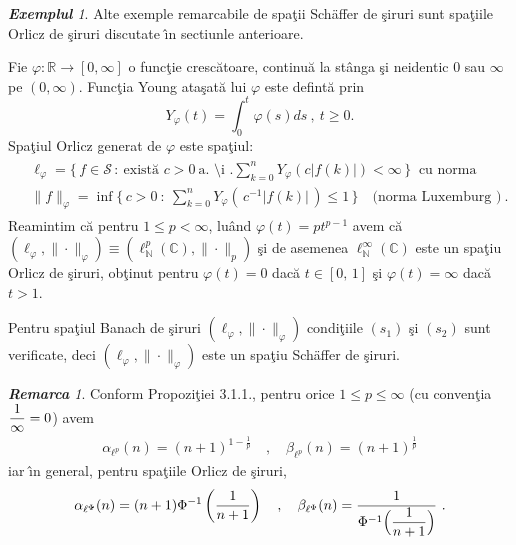 \documentclass[ a4paper, 12pt]{report}
\newcommand{\C}{\mathbb{C}}
\newcommand{\R}{\mathbb{R}}
\newcommand{\N}{\mathbb{N}}
\theoremstyle{definition}
\theoremstyle{remark}
\newtheorem{remarc}{\bf Remarca}[section]
\newtheorem{exemple}{\bf Exemplul}[section]
\numberwithin{equation}{section}
\begin{document}
\begin{exemple}
Alte exemple remarcabile de spa\c tii Sch\"{a}ffer de \c siruri sunt spa\c tiile Orlicz de \c siruri discutate \^\i n sectiunle anterioare.

Fie $\varphi:\R\to[0,\infty]$  o func\c tie cresc\u atoare, continu\u a la st\^ anga \c si neidentic $0$ sau $\infty$ pe $(0,\infty)$. Func\c tia Young ata\c sat\u a lui $\varphi$ este defint\u a prin
$$Y_\varphi(t)=\int_{0}^t\varphi(s)ds\ ,\ t\geq0.$$ Spa\c tiul Orlicz generat de $\varphi$ este spa\c tiul:
\begin{gather*}
\begin{split}
& \ell_{\varphi}=\{\,f\in\mathcal{S}\,:\ \text{exist\u a  }c>0\ \text{a. \^\i .} \sum_{k=0}^nY_\varphi(c|f(k)|)<\infty\,\}\ \text{ cu norma }\\
& \|f\|_{\varphi}=\inf\{\,c>0\ :\ \sum_{k=0}^nY_\varphi(\,c^{-1}|f(k)|\,)\leq 1\,\}\quad \text{(norma Luxemburg )}\ .
\end{split}
\end{gather*}
Reamintim c\u a pentru $1\leq p<\infty$, lu\^ and $\varphi(t)=pt^{p-1}$
avem c\u a $(\ell_{\varphi},\|\cdot\|_{\varphi}) \equiv (\ell^p_{\N}(\C),\|\cdot\|_{p})$ \c si de asemenea
$\ell^{\infty}_{\N}(\C)$ este un spa\c tiu Orlicz de \c siruri, ob\c tinut pentru $\varphi(t)=0$ dac\u a $t\in[0,\, 1]$ \c si
$\varphi(t)=\infty$ dac\u a $t>1$.


Pentru spa\c tiul Banach de \c siruri $(\ell_{\varphi},\|\cdot\|_{\varphi})$ condi\c tiile $(s_1)$ \c si $(s_2)$ sunt verificate,
deci $(\ell_{\varphi},\|\cdot\|_{\varphi})$ este un spa\c tiu Sch\"{a}ffer de \c siruri.
\end{exemple}

\begin{remarc}
Conform Propozi\c tiei 3.1.1., pentru orice $1\leq p\leq\infty$ (cu conven\c tia $\displaystyle\frac{1}{\infty}=0$) avem
\begin{gather*}
\alpha_{\ell^p}(n)=(n+1)^{1-\frac{1}{p}} \quad,\quad \beta_{\ell^p}(n)=(n+1)^{\frac{1}{p}}
\end{gather*}
iar  \^\i n general, pentru spa\c tiile Orlicz de \c siruri,
\begin{gather*}
\alpha_{\ell^{\Phi}}(n)=(n+1)\Phi^{-1}\left(\frac{1}{n+1}\right) \quad,\quad
    \beta_{\ell^{\Phi}}(n)=\frac{1}{\Phi^{-1}\Big(\ds\frac{1}{n+1}\Big)}\ .
\end{gather*}
\end{remarc}
\end{document}
